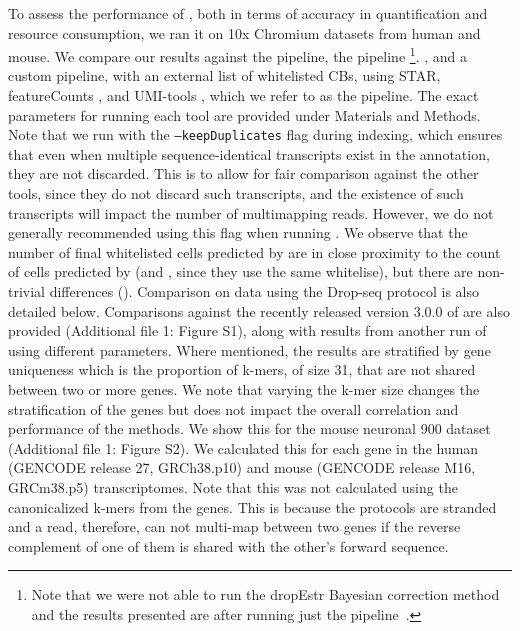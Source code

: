 To assess the performance of \alevin, both in terms of accuracy in quantification and resource consumption, we ran it on 10x Chromium datasets from human and mouse. We compare our results against the \cellr pipeline\citep{tenx}, the \dropest pipeline\citep{dropest} \footnote{Note that we were not able to run the dropEstr Bayesian correction method and the results presented are after running just the \dropest pipeline~\cite{dropseqsrc}.}. , and a custom pipeline, with an external list of whitelisted CBs, using STAR\citep{star}, featureCounts \citep{featurecounts}, and UMI-tools \citep{umitools}, which we refer to as the \naive pipeline. The exact parameters for running each tool are provided under Materials and Methods. Note that we run \alevin with the \texttt{--keepDuplicates} flag during indexing, which ensures that even when multiple sequence-identical transcripts exist in the annotation, they are not discarded. This is to allow for fair comparison against the other tools, since they do not discard such transcripts, and the existence of such transcripts will impact the number of multimapping reads. However, we do not generally recommended using this flag when running \alevin. We observe that the number of final whitelisted cells predicted by \alevin are in close proximity to the count of cells predicted by \cellr (and \dropest, since they use the same whitelise), but there are non-trivial differences (). Comparison on data using the Drop-seq\citep{dropseq} protocol is also detailed below. Comparisons against the recently released version 3.0.0 of \cellr are also provided (Additional file 1: Figure S1), along with results from another run of \alevin using different parameters. Where mentioned, the results are stratified by gene uniqueness which is the proportion of k-mers, of size 31, that are not shared between two or more genes. We note that varying the k-mer size changes the stratification of the genes but does not impact the overall correlation and performance of the methods. We show this for the mouse neuronal 900 dataset (Additional file 1: Figure S2). We calculated this for each gene in the human (GENCODE release 27, GRCh38.p10) and mouse (GENCODE release M16, GRCm38.p5) transcriptomes. Note that this was not calculated using the canonicalized k-mers from the genes. This is because the \scrnaseq protocols are stranded and a read, therefore, can not multi-map between two genes if the reverse complement of one of them is shared with the other's forward sequence. 

